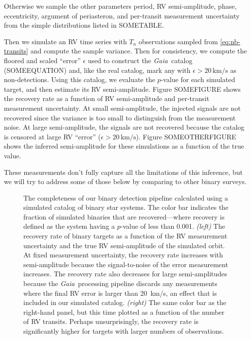\documentclass[modern, letterpaper]{aastex63}
\newcommand{\project}[1]{\textsl{#1}}
\newcommand{\Gaia}{\project{Gaia}}
\begin{document}
Otherwise we sample the other parameters period, RV semi-amplitude, phase, eccentricity, argument of periasteron, and per-transit measurement uncertainty from the simple distributions listed in SOMETABLE.

Then we simulate an RV time series with $T_n$ observations sampled from \autoref{eq:nb-transits} and compute the sample variance.
Then for consistency, we compute the floored and scaled ``error'' $\epsilon$ used to construct the \Gaia\ catalog (SOMEEQUATION) and, like the real catalog, mark any with $\epsilon > 20\,\mathrm{km/s}$ as non-detections.
Using this catalog, we evaluate the $p$-value for each simulated target, and then estimate its RV semi-amplitude.
Figure SOMEFIGURE shows the recovery rate as a function of RV semi-amplitude and per-transit measurement uncertainty.
At small semi-amplitude, the injected signals are not recovered since the variance is too small to distinguish from the measurement noise.
At large semi-amplitude, the signals are not recovered because the catalog is censored at large RV ``error'' ($\epsilon > 20\,\mathrm{km/s}$).
Figure SOMEOTHERFIGURE shows the inferred semi-amplitude for these simulations as a function of the true value.

These measurements don't fully capture all the limitations of this inference, but we will try to address some of those below by comparing to other binary surveys.

\begin{figure}
	\caption{The completeness of our binary detection pipeline calculated using a simulated catalog of binary star systems.
		The color bar indicates the fraction of simulated binaries that are recovered---where recovery is defined as the system having a $p$-value of less than 0.001.
		\emph{(left)} The recovery rate of binary targets as a function of the RV measurement uncertainty and the true RV semi-amplitude of the simulated orbit.
		At fixed measurement uncertainty, the recovery rate increases with semi-amplitude because the signal-to-noise of the error measurement increases.
		The recovery rate also decreases for large semi-amplitudes because the \Gaia\ processing pipeline discards any measurements where the final RV error is larger than 20~km/s, an effect that is included in our simulated catalog.
		\emph{(right)} The same color bar as the right-hand panel, but this time plotted as a function of the number of RV transits.
		Perhaps unsurprisingly, the recovery rate is significantly higher for targets with larger numbers of observations.
		\label{fig:completeness}}
\end{figure}
\end{document}

